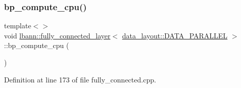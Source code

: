 \subsubsection{\texorpdfstring{bp\+\_\+compute\+\_\+cpu()}{bp\_compute\_cpu()}\hspace{0.1cm}{\footnotesize\ttfamily [2/3]}}
{\footnotesize\ttfamily template$<$$>$ \\
void \hyperlink{classlbann_1_1fully__connected__layer}{lbann\+::fully\+\_\+connected\+\_\+layer}$<$ \hyperlink{base_8hpp_a786677cbfb3f5677b4d84f3056eb08dba37d2a3465f7cbf4ab60f4e79944d0638}{data\+\_\+layout\+::\+D\+A\+T\+A\+\_\+\+P\+A\+R\+A\+L\+L\+EL} $>$\+::bp\+\_\+compute\+\_\+cpu (\begin{DoxyParamCaption}{ }\end{DoxyParamCaption})\hspace{0.3cm}{\ttfamily [private]}}



Definition at line 173 of file fully\+\_\+connected.\+cpp.


